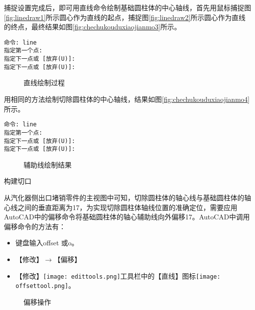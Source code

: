 \begin{procedure}
捕捉设置完成后，即可用直线命令绘制基础圆柱体的中心轴线，首先用鼠标捕捉图\ref{fig:linedraw1}所示圆心作为直线的起点，捕捉图\ref{fig:linedraw2}所示圆心作为直线的终点，最终结果如图\ref{fig:chechukouduxiaojianmo3}所示。
\begin{lstlisting}
命令: line
指定第一个点:
指定下一点或 [放弃(U)]: 
指定下一点或 [放弃(U)]:
\end{lstlisting}

\begin{figure}[htbp]%
\centering
{}\hspace{20pt}
\caption{直线绘制过程}
\end{figure}

用相同的方法绘制切除圆柱体的中心轴线，结果如图\ref{fig:chechukouduxiaojianmo4}所示。
\begin{lstlisting}
命令: line
指定第一个点:
指定下一点或 [放弃(U)]:
指定下一点或 [放弃(U)]:
\end{lstlisting}

\begin{figure}[htbp]%
\centering
{}\hspace{20pt}
\caption{辅助线绘制结果}
\end{figure}

\item 构建切口

从汽化器侧出口堵销零件的主视图中可知，切除圆柱体的轴心线与基础圆柱体的轴心线之间的垂直距离为17，为实现切除圆柱体轴线位置的准确定位，需要应用AutoCAD中的偏移命令将基础圆柱体的轴心辅助线向外偏移17。AutoCAD中调用偏移命令的方法有：

\begin{itemize}
\item 键盘输入offset 或o。
\item 【修改】$\rightarrow$【偏移】
\item 【修改】\texttt{[image: edittools.png]}工具栏中的【直线】图标\texttt{[image: offsettool.png]}。
\end{itemize}

\begin{figure}[htbp]%
\centering
{}\hspace{20pt}
\caption{偏移操作}
\end{figure}


\end{procedure}
